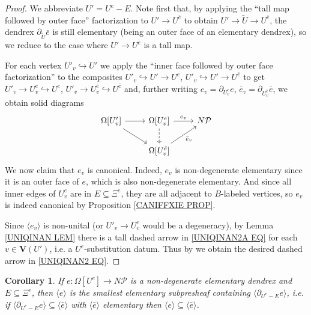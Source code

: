 \documentclass[a4paper,10pt
,draft
]{article}%
\numberwithin{equation}{section}
\numberwithin{figure}{section}
\newtheorem{corollary}[equation]{Corollary}%
\theoremstyle{definition} %
\newcommand{\1}{\ensuremath{\mathbbm 1}}%
\begin{document}
\begin{proof}
	We abbreviate $U' = U^e -E$. 
	Note first that, 
	by applying the
	``tall map followed by outer face'' factorization to
	$U' \to U^{\bar{e}}$
	to obtain
	$U' \to \tilde{U} \to U^{\bar{e}}$,
	the dendrex $\partial_{\tilde{U}} \bar{e}$
	is still elementary (being an outer face of an elementary dendrex),
	so we reduce to the case where $U' \to U^{\bar{e}}$ is a tall map.
	
	For each vertex $U'_v \hookrightarrow U'$ we apply the 
	``inner face followed by outer face factorization''
	to the composites
	$U'_{v} \hookrightarrow U' \to U^{e}$,
	$U'_{v} \hookrightarrow U' \to U^{\bar{e}}$
	to get
	$U'_{v} \to U_{v}^e \hookrightarrow U^e$,
	$U'_{v} \to U_{v}^{\bar{e}} \hookrightarrow U^{\bar{e}}$
	and, further writing
	$e_v = \partial_{U^e_v} e$,
	$\bar{e}_v = \partial_{U^{\bar{e}}_v} \bar{e}$, 
	we obtain solid diagrams
	\begin{equation}\label{UNIQINAN2A EQ}
	\begin{tikzcd}
	\Omega[U'_v] \ar{r} \ar{rd}&
	\Omega[U^e_v] \ar{r}{e_v} \ar[dashed]{d} &
	N \mathcal{P}
	\\
	&
	\Omega[U^{\bar{e}}_v] \ar{ru}[swap]{\bar{e}_v} 
	\end{tikzcd}
	\end{equation}
	We now claim that $e_v$ is canonical. Indeed, $e_v$ is non-degenerate elementary since it is an outer face of $e$, which is also non-degenerate elementary. And since all inner edges of $U^e_v$ are in 
	$E \subseteq \Xi^e$, they are all adjacent to $B$-labeled vertices, 
	so $e_v$
	is indeed canonical by
	Proposition \ref{CANIFFXIE PROP}.
	
	
	Since $\langle e_v \rangle$ is non-unital
	(or $U'_v \to U_v^e$ would be a degeneracy),
	by Lemma \ref{UNIQINAN LEM} there is a tall dashed arrow in \eqref{UNIQINAN2A EQ} for each $v \in \boldsymbol{V}(U')$,
	i.e. a $U^e$-substitution datum. Thus
	by
	\cite[Prop. 3.41]{BP_geo}
	we obtain the desired dashed arrow in \eqref{UNIQINAN2 EQ}.
\end{proof}



\begin{corollary}\label{MINELEMSH COR}
	If $e \colon \Omega[U^e] \to N \mathcal{P}$ is a non-degenerate elementary dendrex
	and $E \subseteq \Xi^e$,
	then 
	$\langle e\rangle$ is the smallest elementary subpresheaf
	containing $\langle \partial_{U^e - E} e\rangle$,
	i.e. if 
	$\langle \partial_{U^e - E} e\rangle
	\subseteq \langle \bar{e} \rangle$
	with $\langle \bar{e} \rangle$
	elementary then 
	$\langle e\rangle
	\subseteq \langle \bar{e} \rangle$.
\end{corollary}
\end{document}
